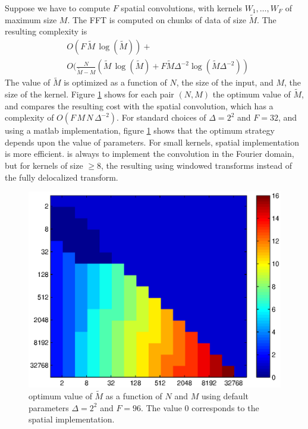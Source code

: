\documentclass{article}
\begin{document}
Suppose we have to compute $F$ spatial convolutions, 
with kernels $W_1,\dots,W_F$ of maximum size $M$.
The FFT is computed on chunks of data 
of size $\tilde{M}$.
 The resulting complexity is 
\begin{align*}
 &O(F\, \tilde{M}\, \log(\tilde{M})) + \\
 &O( \frac{N}{\tilde{M} - M} ( \tilde{M}\, \log(\tilde{M}) + F \tilde{M} \Delta^{-2} \log(\tilde{M} \Delta^{-2}) )
\end{align*}
The value of $\tilde{M}$ is optimized as a function of $N$, the size of the input, 
and $M$, the size of the kernel. Figure \ref{fftfig} shows for each pair $(N,M)$ the 
optimum value of $\tilde{M}$, and compares the resulting cost 
with the spatial convolution, which has a complexity of $O(F \, M \, N\, \Delta^{-2})$.
 For standard choices of $\Delta=2^2$ and $F=32$, 
and using a matlab implementation, figure \ref{fftfig} 
shows that the optimum 
strategy depends upon the value of parameters. For small kernels, 
spatial implementation is more efficient. 
is always to implement the convolution in the Fourier domain, but
for kernels of size $\geq 8$, the resulting 
using windowed transforms instead of the fully delocalized transform.


\begin{figure}[ht]
\includegraphics[scale=0.48]{img/fftconvanalysis1.eps}
\caption{optimum value of $\tilde{M}$ as a function of $N$ and $M$ 
using default parameters $\Delta=2^2$ and $F=96$. The value $0$ 
corresponds to the spatial implementation.} 
\label{fftfig}
\end{figure}
\end{document}

